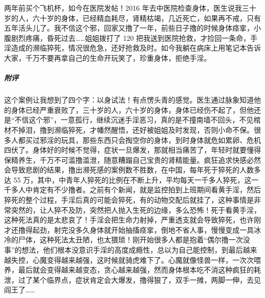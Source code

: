 \begin{case}
    两年前买个飞机杯，如今在医院发帖！2016 年去中医院检查身体，医生说我三十岁的人，六十岁的身体，已经精血耗尽，肾精枯竭，几近死亡，如果再不戒，只有五年活头儿了。我不信这个邪，回家又撸了一年，前些日子撸的时候身体痉挛，小腹剧烈疼痛，昏死过去……姐姐拨打了 120 把我送到医院抢救，才捡回一条命，手淫造成的濒临猝死，情况很危急，还好抢救及时。如今我躺在病床上用笔记本告诉大家，千万不要再拿自己的生命开玩笑了，珍重身体，拒绝手淫。
    \subparagraph{附评} 这个案例让我想到了四个字：以身试法！有点愣头青的感觉。医生通过脉象知道他的身体已经严重衰败了，三十岁的人，六十岁的身体，身体已经伤不起了，但他还是“不信这个邪”，一意孤行，继续沉迷手淫恶习，真的是不撞南墙不回头，不见棺材不掉泪，撸到濒临猝死，才幡然醒悟，还好被姐姐及时发现，否则小命不保。很多人都买过邪淫的玩具，那些东西只会掏空你的身体，到时身体就危如累卵、危机四伏了。身体好的时候不觉得，症状一旦爆发，那就相当痛苦了，年轻时就要懂得保精养生，千万不可滥撸滥泄，随意糟蹋自己宝贵的肾精能量。疯狂追求快感必然会导致悲剧的结果，撸出濒死感的案例数不胜数，在中国，每年死于猝死的人数多达 55 万，其中，中青年人猝死的比例在不断上升，平均每天一千多人猝死，这一千多人中肯定有不少撸者。之前有个新闻，就是监控拍到上班期间看黄手淫，然后猝死的整个过程，手淫后真的可能会猝死，有的动物交配后就挂了，这种事情是非常突然的，让人猝不及防，突然把人抛入生死的边缘，多么恐怖！死于看黄手淫，这种死法真的是太悲哀了！手淫会把生命力射掉，严重透支就会导致猝死，也许刚才还撸得起劲，射完没多久身体就开始抽搐痉挛，倒地不省人事，慢慢变成一具冰冷的尸体，这种死法太丑陋，也太猥琐！刚开始很多人都是抱着“偶尔撸一次没事”的想法，他们根本没意识手淫的高度成瘾性，总以为自己能控制，到最后越来越失控，心魔变得越来越强，这时候就骑虎难下了。心魔就像怪兽一样，一次次喂养，最后就会变得越来越变态，贪心越来越强，然而身体根本吃不消这种疯狂的耗泄，过了某个临界点，症状肯定会大爆发，撸得狠了，双手一摊，两脚一伸，去见阎王了……
\end{case}

